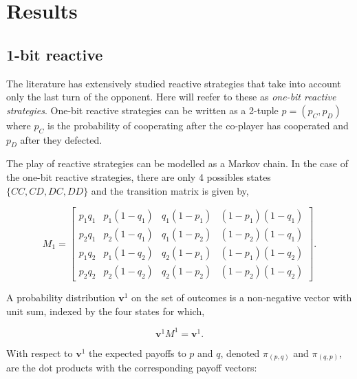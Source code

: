 \documentclass{article}
\begin{document}
\section{Results}

\subsection{1-bit reactive}

The literature has extensively studied reactive strategies that take into
account only the last turn of the opponent. Here will reefer to these as
\textit{one-bit reactive strategies}. One-bit reactive strategies can be written
as a 2-tuple \(p = (p_{C}, p_{D})\) where \(p_{C}\) is the probability of
cooperating after the co-player has cooperated and \(p_{D}\) after they
defected.

The play of reactive strategies can be modelled as a Markov chain. In the case
of the one-bit reactive strategies, there are only 4 possibles states \(\{CC,
CD, DC, DD\}\) and the transition matrix is given by,

\begin{equation}
\displaystyle M_1 = \left[\begin{matrix}p_{1} q_{1} & p_{1} \left(1 - q_{1}\right) & q_{1} \left(1 - p_{1}\right) & \left(1 - p_{1}\right) \left(1 - q_{1}\right)\\p_{2} q_{1} & p_{2} \left(1 - q_{1}\right) & q_{1} \left(1 - p_{2}\right) & \left(1 - p_{2}\right) \left(1 - q_{1}\right)\\p_{1} q_{2} & p_{1} \left(1 - q_{2}\right) & q_{2} \left(1 - p_{1}\right) & \left(1 - p_{1}\right) \left(1 - q_{2}\right)\\p_{2} q_{2} & p_{2} \left(1 - q_{2}\right) & q_{2} \left(1 - p_{2}\right) & \left(1 - p_{2}\right) \left(1 - q_{2}\right)\end{matrix}\right].
\end{equation}

A probability distribution \(\mathbf{v}^1\) on the set of outcomes is a
non-negative vector with unit sum, indexed by the four states for which,

\begin{equation*}
  \mathbf{v}^{1} M^{1} = \mathbf{v}^{1}.
\end{equation*}

With respect to \( \mathbf{v}^{1}\) the expected payoffs to \(p\) and \(q\),
denoted \(\pi_{(p, q)}\) and \(\pi_{(q, p)}\), are the dot products with the
corresponding payoff vectors:
\end{document}
